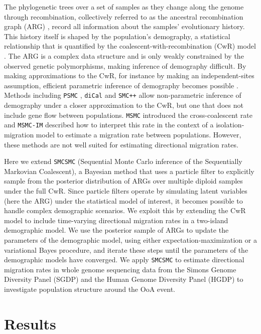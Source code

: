 \documentclass{article}
\begin{document}
The phylogenetic trees over a set of samples as they change along the genome through recombination, collectively referred to as the ancestral recombination graph (ARG) \cite{Griffiths1997a,Rasmussen2014}, record all information about the samples' evolutionary history.  This history itself is shaped by the population's demography, a statistical relationship that is quantified by the coalescent-with-recombination (CwR) model \cite{Griffiths1997a}.  The ARG is a complex data structure and is only weakly constrained by the observed genetic polymorphisms, making inference of demography difficult. By making approximations to the CwR, for instance by making an independent-sites assumption, efficient parametric inference of demography becomes possible \cite{Excoffier2013,McVean2005}.  Methods including {\tt PSMC} \cite{Li2011}, {\tt diCal} \cite{Steinrucken2015} and {\tt SMC++} \cite{Terhorst2015} allow non-parametric inference of demography under a closer approximation to the CwR, but one that does not include gene flow between populations. {\tt MSMC} \cite{Schiffels2014} introduced the cross-coalescent rate and {\tt MSMC-IM} described how to interpret this rate in the context of a isolation-migration model to estimate a migration rate between populations\cite{Wang2019a}. However, these methods are not well suited for estimating directional migration rates.

Here we extend {\tt SMCSMC} \cite{Henderson2018} (Sequential Monte Carlo inference of the Sequentially Markovian Coalescent), a Bayesian method that uses a particle filter to explicitly sample from the posterior distribution of ARGs over multiple diploid samples under the full CwR.
Since particle filters operate by simulating latent variables (here the ARG) under the statistical model of interest, it becomes possible to handle complex demographic scenarios.  We exploit this by extending the CwR model to include time-varying directional migration rates in a two-island demographic model.  We use the posterior sample of ARGs to update the parameters of the demographic model, using either expectation-maximization or a variational Bayes procedure, and iterate these steps until the parameters of the demographic models have converged.   We apply {\tt SMCSMC} to estimate directional migration rates in whole genome sequencing data from the Simons Genome Diversity Panel (SGDP) \cite{Mallick2016} and the Human Genome Diversity Panel (HGDP) \cite{Bergstrom2019} to investigate population structure around the OoA event.

\section{Results}
\end{document}
